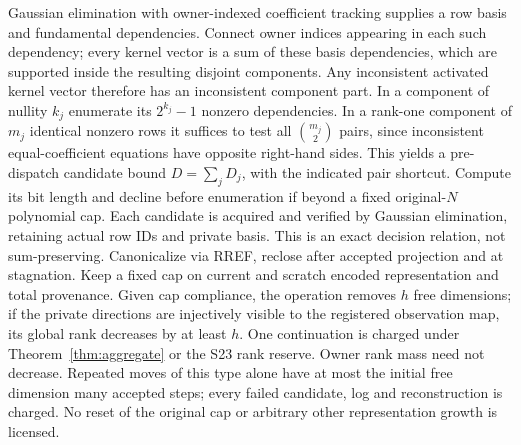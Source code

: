 \documentclass[11pt]{article}
\begin{document}
Gaussian elimination with owner-indexed coefficient tracking supplies a row basis and fundamental dependencies. Connect owner indices appearing in each such dependency; every kernel vector is a sum of these basis dependencies, which are supported inside the resulting disjoint components. Any inconsistent activated kernel vector therefore has an inconsistent component part. In a component of nullity $k_j$ enumerate its $2^{k_j}-1$ nonzero dependencies. In a rank-one component of $m_j$ identical nonzero rows it suffices to test all $\binom{m_j}{2}$ pairs, since inconsistent equal-coefficient equations have opposite right-hand sides. This yields a pre-dispatch candidate bound $D=\sum_j D_j$, with the indicated pair shortcut. Compute its bit length and decline before enumeration if beyond a fixed original-$N$ polynomial cap. Each candidate is acquired and verified by Gaussian elimination, retaining actual row IDs and private basis. This is an exact decision relation, not sum-preserving. Canonicalize via RREF, reclose after accepted projection and at stagnation. Keep a fixed cap on current and scratch encoded representation and total provenance. Given cap compliance, the operation removes $h$ free dimensions; if the private directions are injectively visible to the registered observation map, its global rank decreases by at least $h$. One continuation is charged under Theorem~\ref{thm:aggregate} or the S23 rank reserve. Owner rank mass need not decrease. Repeated moves of this type alone have at most the initial free dimension many accepted steps; every failed candidate, log and reconstruction is charged. No reset of the original cap or arbitrary other representation growth is licensed.
\end{document}
